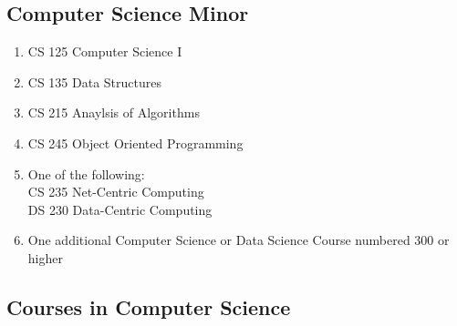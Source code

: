 \documentclass[
  letterpaper,
]{scrbook}
\providecommand{\tightlist}{%
  \setlength{\itemsep}{0pt}\setlength{\parskip}{0pt}}
\begin{document}
\subsection{Computer Science Minor}\label{computer-science-minor}

\begin{enumerate}
\def\labelenumi{\arabic{enumi}.}
\tightlist
\item
  CS 125 Computer Science I
\item
  CS 135 Data Structures
\item
  CS 215 Anaylsis of Algorithms
\item
  CS 245 Object Oriented Programming
\item
  One of the following:\\
  CS 235 Net-Centric Computing\\
  DS 230 Data-Centric Computing\\
\item
  One additional Computer Science or Data Science Course numbered 300 or
  higher
\end{enumerate}

\subsection{Courses in Computer
Science}\label{courses-in-computer-science}
\end{document}
